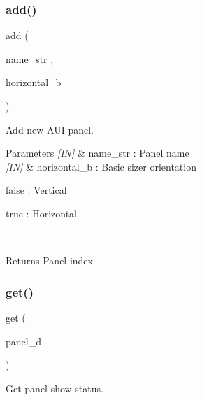 \subsubsection{add()}
{\footnotesize\ttfamily add (\begin{DoxyParamCaption}\item[{name\+\_\+str}]{,  }\item[{horizontal\+\_\+b}]{ }\end{DoxyParamCaption})}



Add new A\+UI panel. 


\begin{DoxyCode}{0}
\end{DoxyCode}



\begin{DoxyParams}{Parameters}
{\em \mbox{[}\+I\+N\mbox{]}} & name\+\_\+str \+: Panel name \\
\hline
{\em \mbox{[}\+I\+N\mbox{]}} & horizontal\+\_\+b \+: Basic sizer orientation \begin{DoxyItemize}
\item false \+: Vertical \item true \+: Horizontal \end{DoxyItemize}
\\
\hline
\end{DoxyParams}
\begin{DoxyReturn}{Returns}
Panel index 
\end{DoxyReturn}
\mbox{\label{classpanel_ac8a7922984844f20d35afc355336ceb2}} 
\subsubsection{get()}
{\footnotesize\ttfamily get (\begin{DoxyParamCaption}\item[{panel\+\_\+d}]{ }\end{DoxyParamCaption})}



Get panel show status. 


\begin{DoxyCode}{0}
\end{DoxyCode}



